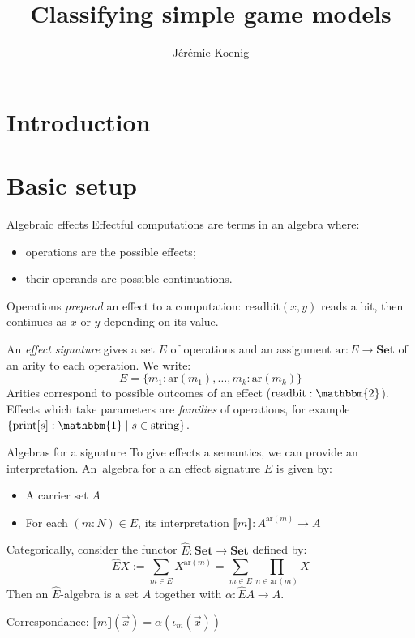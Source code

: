 \documentclass{beamer}
\title{Classifying simple game models}
\author{J\'er\'emie Koenig}
\newcommand{\fun}[1]{\mathrm{#1}}
\newcommand{\cat}[1]{\mathbf{#1}}
\begin{document}
\begin{frame}
\titlepage
\end{frame}

\section{Introduction}

\section{Basic setup}

\begin{frame}{Algebraic effects} %
Effectful computations are terms in an algebra where: \pause
\begin{itemize}
  \item operations are the possible effects;
  \item their operands are possible continuations.
\end{itemize}
\pause
Operations \emph{prepend} an effect to a computation:
$\fun{readbit}(x, y)$ reads a bit,
then continues as $x$ or $y$ depending on its value.
\pause

\vfill
An \emph{effect signature} gives a set $E$ of operations
and an assignment $\fun{ar} : E \rightarrow \cat{Set}$
of an arity to each operation.
We write:
\[
    E = \{ m_1 : \fun{ar}(m_1), \ldots, m_k : \fun{ar}(m_k) \}
\]
\pause
Arities correspond to possible outcomes of an effect
($\fun{readbit} : \mathbbm{2}$).
Effects which take parameters are \emph{families}
of operations, for example
$\{ \fun{print}[s] : \mathbbm{1} \mid s \in \fun{string} \}$.
\end{frame}

\begin{frame}{Algebras for a signature} %
To give effects a semantics,
we can provide an interpretation.
An~algebra for a an effect signature $E$
is given by:
\begin{itemize}
  \item A carrier set $A$
  \item For each $(m : N) \in E$, its interpretation
    $\llbracket m \rrbracket : A^{\fun{ar}(m)} \rightarrow A$
\end{itemize}
\pause

\vfill
Categorically, consider the functor
$\hat{E} : \cat{Set} \rightarrow \cat{Set}$
defined by:
\[
    \hat{E} X := \sum_{m \in E} X^{\fun{ar}(m)}
               = \sum_{m \in E} \prod_{n \in \fun{ar}(m)} X
\]
Then an $\hat{E}$-algebra is a set $A$
together with $\alpha : \hat{E} A \rightarrow A$.
\pause

\vfill
Correspondance:
$\llbracket m \rrbracket(\vec{x}) = \alpha(\iota_m(\vec{x}))$
\end{frame}
\end{document}

